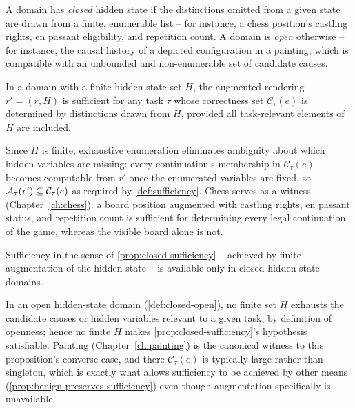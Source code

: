 \begin{definition}
\label{def:closed-open}
A domain has \emph{closed} hidden state if the distinctions omitted from a
given state are drawn from a finite, enumerable list -- for instance, a
chess position's castling rights, en passant eligibility, and repetition
count. A domain is \emph{open} otherwise -- for instance, the causal
history of a depicted configuration in a painting, which is compatible
with an unbounded and non-enumerable set of candidate causes.
\end{definition}

\begin{proposition}
\label{prop:closed-sufficiency}
In a domain with a finite hidden-state set $H$, the augmented rendering
$r' = (r, H)$ is sufficient for any task $\tau$ whose correctness set
$\mathcal{C}_\tau(e)$ is determined by distinctions drawn from $H$,
provided all task-relevant elements of $H$ are included.
\end{proposition}

\begin{proofsketch}
Since $H$ is finite, exhaustive enumeration eliminates ambiguity about
which hidden variables are missing: every continuation's membership in
$\mathcal{C}_\tau(e)$ becomes computable from $r'$ once the enumerated
variables are fixed, so $\mathcal{A}_{\tau}(r') \subseteq \mathcal{C}_\tau(e)$
as required by \cref{def:sufficiency}. Chess serves as a witness
(Chapter~\ref{ch:chess}): a board position augmented with castling rights,
en passant status, and repetition count is sufficient for determining
every legal continuation of the game, whereas the visible board alone is
not.
\end{proofsketch}

\begin{proposition}
\label{prop:sufficiency-closed-only}
Sufficiency in the sense of \cref{prop:closed-sufficiency} -- achieved by
finite augmentation of the hidden state -- is available only in closed
hidden-state domains.
\end{proposition}

\begin{proofsketch}
In an open hidden-state domain (\cref{def:closed-open}), no finite set $H$
exhausts the candidate causes or hidden variables relevant to a given
task, by definition of openness; hence no finite $H$ makes
\cref{prop:closed-sufficiency}'s hypothesis satisfiable. Painting
(Chapter~\ref{ch:painting}) is the canonical witness to this proposition's
converse case, and there $\mathcal{C}_\tau(e)$ is typically large rather
than singleton, which is exactly what allows sufficiency to be achieved by
other means (\cref{prop:benign-preserves-sufficiency}) even though
augmentation specifically is unavailable.
\end{proofsketch}
